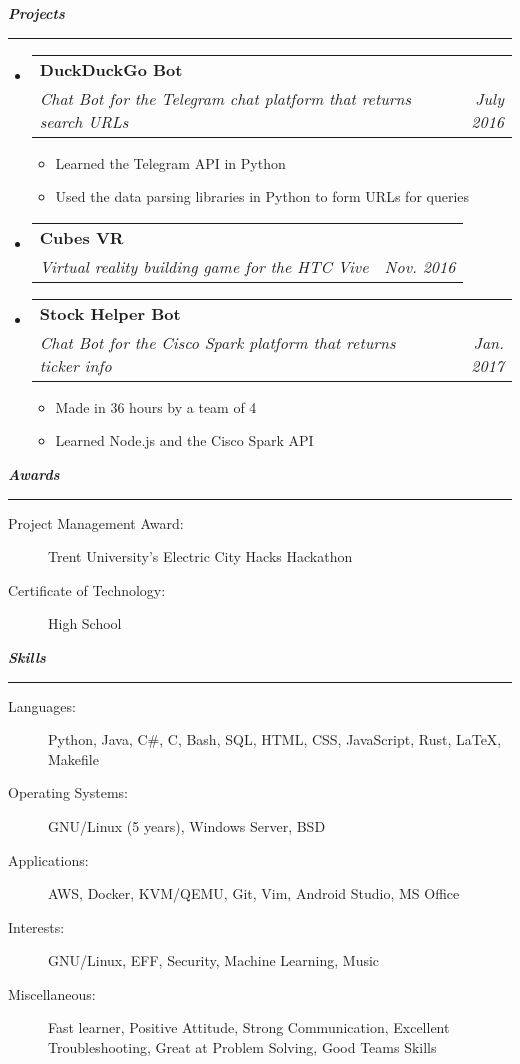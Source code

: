 \documentclass[letterpaper,11pt]{article}
\makeatletter
\newcommand{\resitem}[1]{\item #1 \vspace{-2pt}}
\newcommand{\mysection}[1]{\vspace{5pt} {\bfseries \textsl{#1}} \\ {\color{gray} \rule[5pt]{\textwidth}{1pt}}}
\newcommand{\ressubheading}[4]{\begin{tabular*}{6.5in}{l@{\extracolsep{\fill}}r}
		\textbf{#1} & #2 \\
		\textit{#3} & \textit{#4} \\
\end{tabular*}\vspace{-6pt}}
\makeatother
\begin{document}
\mysection{Projects}
\begin{itemize}
\item
	\ressubheading{DuckDuckGo Bot}{}{Chat Bot for the Telegram chat platform that returns search URLs}{July 2016}
	\begin{itemize}
		\resitem{Learned the Telegram API in Python}
		\resitem{Used the data parsing libraries in Python to form URLs for queries}
	\end{itemize}

\item
\ressubheading{Cubes VR}{}{Virtual reality building game for the HTC Vive}{Nov. 2016}

\item
	\ressubheading{Stock Helper Bot}{}{Chat Bot for the Cisco Spark platform that returns ticker info}{Jan. 2017}
	\begin{itemize}
		\resitem{Made in 36 hours by a team of 4}
		\resitem{Learned Node.js and the Cisco Spark API}
	\end{itemize}
\end{itemize}

\mysection{Awards}
\begin{description}
	\item[Project Management Award:]
	Trent University's Electric City Hacks Hackathon
	\item[Certificate of Technology:] High School
\end{description}

\mysection{Skills}
\begin{description}
\item[Languages:]
Python, Java, C\#, C, Bash, SQL, HTML, CSS, JavaScript, Rust, \LaTeX{}, Makefile
\item[Operating Systems:]
GNU/Linux (5 years), Windows Server, BSD
\item[Applications:]
AWS, Docker, KVM/QEMU, Git, Vim, Android Studio, MS Office
\item[Interests:]
GNU/Linux, EFF, Security, Machine Learning, Music
\item[Miscellaneous:]
Fast learner, Positive Attitude, Strong Communication, Excellent Troubleshooting, Great at Problem Solving, Good Teams Skills
\end{description}
\end{document}
